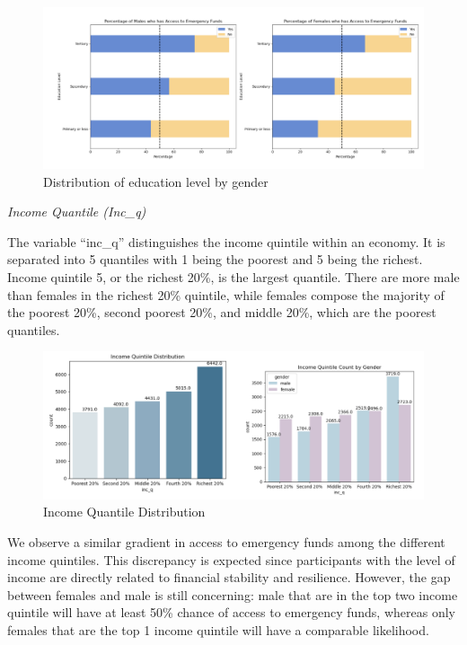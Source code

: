 \documentclass[12pt]{article}
\begin{document}
\begin{figure}

{\centering \includegraphics[width=1.1\linewidth]{graphs/f24_graph5} 

}

\caption{Distribution of education level by gender}\label{fig:unnamed-chunk-6}
\end{figure}

\emph{Income Quantile (Inc\_q)}

The variable ``inc\_q'' distinguishes the income quintile within an
economy. It is separated into 5 quantiles with 1 being the poorest and 5
being the richest. Income quintile 5, or the richest 20\%, is the
largest quantile. There are more male than females in the richest 20\%
quintile, while females compose the majority of the poorest 20\%, second
poorest 20\%, and middle 20\%, which are the poorest quantiles.

\begin{figure}

{\centering \includegraphics[width=1.1\linewidth]{graphs/income_graph6} 

}

\caption{Income Quantile Distribution}\label{fig:unnamed-chunk-7}
\end{figure}

We observe a similar gradient in access to emergency funds among the
different income quintiles. This discrepancy is expected since
participants with the level of income are directly related to financial
stability and resilience. However, the gap between females and male is
still concerning: male that are in the top two income quintile will have
at least 50\% chance of access to emergency funds, whereas only females
that are the top 1 income quintile will have a comparable likelihood.
\end{document}
